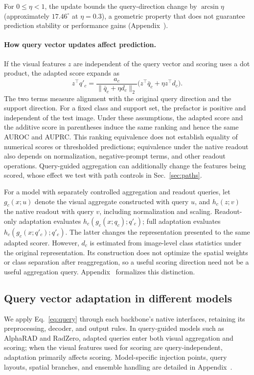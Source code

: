 \documentclass[10pt,twocolumn,letterpaper]{article}
\begin{document}
For $0\leq\eta<1$, the update bounds the query-direction change by $\arcsin\eta$ (approximately $17.46^\circ$ at $\eta=0.3$), a geometric property that does not guarantee prediction stability or performance gains (Appendix~).

\paragraph{How query vector updates affect prediction.}
If the visual features $z$ are independent of the query vector and scoring uses a dot product, the adapted score expands as
\begin{equation}
z^\top q'_c=\frac{a_c}{\|\bar q_c+\eta d_c\|_2}
\big(z^\top\bar q_c+\eta z^\top d_c\big).
\label{eq:linear}
\end{equation}
The two terms measure alignment with the original query direction and the support direction. For a fixed class and support set, the prefactor is positive and independent of the test image. Under these assumptions, the adapted score and the additive score in parentheses induce the same ranking and hence the same AUROC and AUPRC. This ranking equivalence does not establish equality of numerical scores or thresholded predictions; equivalence under the native readout also depends on normalization, negative-prompt terms, and other readout operations. Query-guided aggregation can additionally change the features being scored, whose effect we test with path controls in Sec.~\ref{sec:paths}.

For a model with separately controlled aggregation and readout queries, let $g_c(x;u)$ denote the visual aggregate constructed with query $u$, and $h_c(z;v)$ the native readout with query $v$, including normalization and scaling. Readout-only adaptation evaluates $h_c(g_c(x;q_c);q'_c)$; full adaptation evaluates $h_c(g_c(x;q'_c);q'_c)$. The latter changes the representation presented to the same adapted scorer. However, $d_c$ is estimated from image-level class statistics under the original representation. Its construction does not optimize the spatial weights or class separation after reaggregation, so a useful scoring direction need not be a useful aggregation query. Appendix~ formalizes this distinction.

\subsection{Query vector adaptation in different models}
\label{sec:interfaces}
We apply Eq.~\ref{eq:query} through each backbone's native interfaces, retaining its preprocessing, decoder, and output rules. In query-guided models such as AlphaRAD and RadZero, adapted queries enter both visual aggregation and scoring; when the visual features used for scoring are query-independent, adaptation primarily affects scoring. Model-specific injection points, query layouts, spatial branches, and ensemble handling are detailed in Appendix~.
\end{document}
